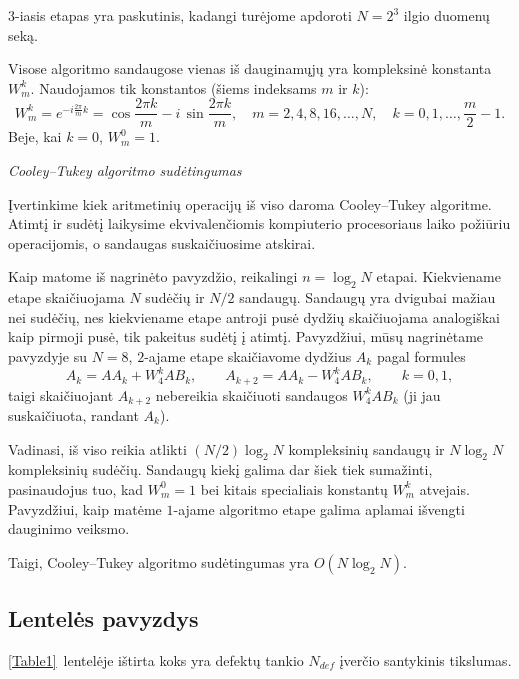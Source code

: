 \documentclass[a4paper,12pt]{article}
\begin{document}
3-iasis etapas yra paskutinis, kadangi turėjome apdoroti $N=2^3$ ilgio duomenų seką.

Visose algoritmo sandaugose vienas iš dauginamųjų yra kompleksinė konstanta $W_m^{k}$.
Naudojamos tik konstantos (šiems indeksams $m$ ir $k$):
\[
    W_m^k = e^{\displaystyle -i \frac{2\pi}{m} k} = \cos \frac{2\pi k}{m} - i\, \sin \frac{2\pi k}{m}, \quad m = 2, 4, 8, 16, \ldots, N, \quad k =0, 1, \ldots, \frac{m}{2}-1.
\]
Beje, kai $k=0$, $W_m^0=1$.

\medskip\noindent
\textit{Cooley--Tukey algoritmo sudėtingumas}
\nopagebreak
\medskip

Įvertinkime kiek aritmetinių operacijų iš viso daroma Cooley--Tukey algoritme. Atimtį ir sudėtį laikysime ekvivalenčiomis kompiuterio procesoriaus laiko požiūriu operacijomis,
o sandaugas suskaičiuosime atskirai.

Kaip matome iš nagrinėto pavyzdžio, reikalingi $n=\log_2 N$ etapai.
Kiekviename etape skaičiuojama $N$ sudėčių ir $N/2$ sandaugų.
Sandaugų yra dvigubai mažiau nei sudėčių, nes kiekviename etape antroji pusė dydžių skaičiuojama analogiškai kaip pirmoji pusė, tik pakeitus sudėtį į atimtį.
Pavyzdžiui, mūsų nagrinėtame pavyzdyje su $N=8$, $2$-ajame etape skaičiavome dydžius $A_k$ pagal formules
\[
    A_k = AA_k + W_4^k AB_k, \qquad A_{k+2} = AA_k - W_4^k AB_k, \qquad k = 0, 1,
\]
taigi skaičiuojant $A_{k+2}$ nebereikia skaičiuoti sandaugos $W_4^k AB_k$ (ji jau suskaičiuota, randant $A_k$).

Vadinasi, iš viso reikia atlikti $(N/2) \log_2 N$ kompleksinių sandaugų ir $N \log_2 N$ kompleksinių sudėčių.
Sandaugų kiekį galima dar šiek tiek sumažinti, pasinaudojus tuo, kad $W_m^0=1$ bei kitais specialiais konstantų $W_m^k$ atvejais.
Pavyzdžiui, kaip matėme $1$-ajame algoritmo etape galima aplamai išvengti dauginimo veiksmo.

Taigi, Cooley--Tukey algoritmo sudėtingumas yra $O(N \log_2 N)$.

\subsection{Lentelės pavyzdys}

\ref{Table1}~lentelėje ištirta koks yra defektų tankio $N_{def}$ įverčio santykinis tikslumas.
\end{document}
